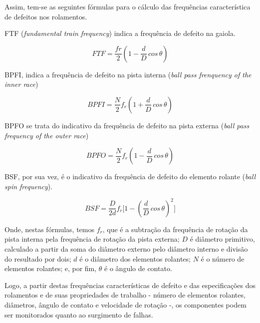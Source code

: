 \documentclass[
	12pt,				
	oneside,			
	a4paper,			
	english,			
	brazil,			
	]{abntex2ppgsi}
\begin{document}

Assim, tem-se as seguintes fórmulas para o cálculo das frequências característica de defeitos nos rolamentos.

FTF (\textit{fundamental train frequency}) indica a frequência de defeito na gaiola.

\begin{equation}
	FTF = \frac{fr}{2} \left ( 1 - \frac{d}{D} \,cos \, \theta \right ) 
	\label{eq: FTF}
\end{equation}

BPFI, indica a frequência de defeito na pista interna (\textit{ball pass frenquency of the inner race})

\begin{equation}
	BPFI = \frac{N}{2}f_{r} \left ( 1 + \frac{d}{D} \,cos \, \theta \right ) 
	\label{eq: BPFI}
\end{equation}

BPFO se trata do indicativo da frequência de defeito na pista externa (\textit{ball pass frequency of the outer race})

\begin{equation}
	BPFO = \frac{N}{2}f_{r} \left ( 1 - \frac{d}{D} \,cos \, \theta \right )
	\label{eq: BPFO}
\end{equation}

BSF, por sua vez, é o indicativo da frequência de defeito do elemento rolante (\textit{ball spin frequency}).

\begin{equation}
	BSF = \frac{D}{2d}f_{r} \Bigg[  1 - \left ( \frac{d}{D} \,cos \, \theta \right ) ^{2}  \Bigg]
	\label{eq: BSF}
\end{equation}

Onde, nestas fórmulas, temos $f_{r}$, que é a subtração da frequência de rotação da pista interna pela frequência de rotação da pista externa; $D$ é diâmetro primitivo, calculado a partir da soma do diâmetro externo pelo diâmetro interno e divisão do resultado por dois; $d$ é o diâmetro dos elementos rolantes; $N$ é o número de elementos rolantes; e, por fim, $\theta$ é o ângulo de contato.

Logo, a partir destas frequências características de defeito e das especificações dos rolamentos e de suas propriedades de trabalho - número de elementos rolantes, diâmetros, ângulo de contato e velocidade de rotação -, os componentes podem ser monitorados quanto ao surgimento de falhas.  

\subsection{}
\end{document}
